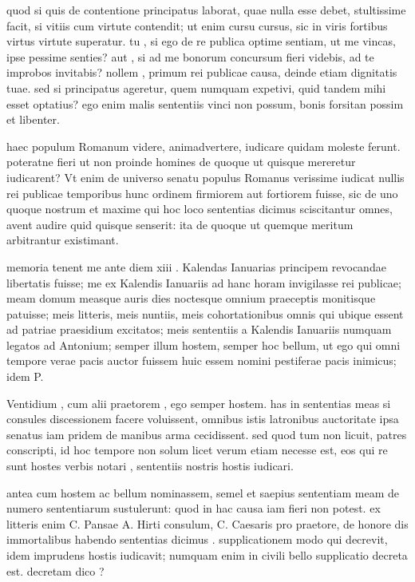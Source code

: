  quod si quis de contentione principatus laborat, quae nulla esse debet, stultissime facit, si vitiis cum virtute contendit; ut enim cursu cursus, sic in viris fortibus virtus virtute superatur. tu , si ego de re publica optime sentiam, ut me vincas, ipse pessime senties? aut , si ad me bonorum concursum fieri videbis, ad te improbos invitabis? nollem , primum rei publicae causa, deinde etiam dignitatis tuae. sed si principatus ageretur, quem numquam expetivi, quid tandem mihi esset optatius? ego enim malis sententiis vinci non possum, bonis forsitan possim et libenter.

 haec populum Romanum videre, animadvertere, iudicare quidam moleste ferunt. poteratne fieri ut non proinde homines de quoque ut quisque mereretur iudicarent? Vt enim de universo senatu populus Romanus verissime iudicat nullis rei publicae temporibus hunc ordinem firmiorem aut fortiorem fuisse, sic de uno quoque nostrum et maxime qui hoc loco sententias dicimus sciscitantur omnes, avent audire quid quisque senserit: ita de quoque ut quemque meritum arbitrantur existimant.

 memoria tenent me ante diem xiii . Kalendas Ianuarias principem revocandae libertatis fuisse; me ex Kalendis Ianuariis ad hanc horam invigilasse rei publicae; meam domum measque auris dies noctesque omnium praeceptis monitisque patuisse; meis litteris, meis nuntiis, meis cohortationibus omnis qui ubique essent ad patriae praesidium excitatos; meis sententiis a Kalendis Ianuariis numquam legatos ad Antonium; semper illum hostem, semper hoc bellum, ut ego qui omni tempore verae pacis auctor fuissem huic essem nomini pestiferae pacis inimicus; idem P.

 Ventidium , cum alii praetorem , ego semper hostem. has in sententias meas si consules discessionem facere voluissent, omnibus istis latronibus auctoritate ipsa senatus iam pridem de manibus arma cecidissent. sed quod tum non licuit, patres conscripti, id hoc tempore non solum licet verum etiam necesse est, eos qui re sunt hostes verbis notari , sententiis nostris hostis iudicari.

 antea cum hostem ac bellum nominassem, semel et saepius sententiam meam de numero sententiarum sustulerunt: quod in hac causa iam fieri non potest. ex litteris enim C. Pansae A. Hirti consulum, C. Caesaris pro praetore, de honore dis immortalibus habendo sententias dicimus . supplicationem modo qui decrevit, idem imprudens hostis iudicavit; numquam enim in civili bello supplicatio decreta est. decretam dico ?

